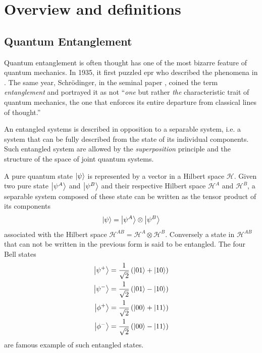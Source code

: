 \part{Overview and definitions}


\chapter{Quantum Entanglement}
\label{section:entanglement}

Quantum entanglement is often thought has one of the most bizarre feature of quantum mechanics. 
In 1935, it first puzzled \acrfull{epr} who described the phenomena in \cite{Einstein35}. 
The same year, Schrödinger, in the seminal paper \cite{Schrödinger35},
coined the term \textit{entanglement} and portrayed it as not \enquote{\textit{one} but rather \textit{the} characteristic trait of quantum mechanics, the one that enforces its entire departure from classical lines of thought.}

An entangled systems is described in opposition to a separable system, i.e. a system that can be fully described from the state of its individual components. 
Such entangled system are allowed by the \textit{superposition} principle and the structure of the space of joint quantum systems. 

A pure quantum state $\ket{\psi}$ is represented by a vector in a Hilbert space $\mathscr{H}$.
Given two pure state $\ket{\psi^A}$ and $\ket{\psi^B}$ and their respective Hilbert space $\mathscr{H}^A$ and $\mathscr{H}^B$, a separable system composed of these state can be written as the tensor product of its components
\begin{equation}
	\ket{\psi} = \ket{\psi^A} \otimes \ket{\psi^B}
	\label{eq:separable_state}
\end{equation}
associated with the Hilbert space $\mathscr{H}^{AB}=\mathscr{H}^A\otimes\mathscr{H}^B$. 
Conversely a state in $\mathscr{H}^{AB}$ that can not be written in the previous form is said to be entangled.
The four Bell states 
\begin{align}
	\ket{\psi^+} &= \frac{1}{\sqrt{2}}\left(\ket{01}+\ket{10}\right) \\
	\ket{\psi^-} &= \frac{1}{\sqrt{2}}\left(\ket{01}-\ket{10}\right) \\
	\ket{\phi^+} &= \frac{1}{\sqrt{2}}\left(\ket{00}+\ket{11}\right) \\
	\ket{\phi^-} &= \frac{1}{\sqrt{2}}\left(\ket{00}-\ket{11}\right)
	\label{eq:bell_states}
\end{align}
are famous example of such entangled states.

